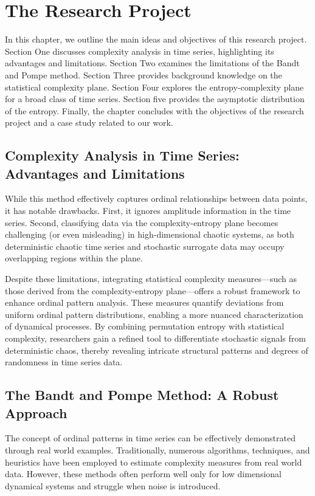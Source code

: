 \chapter{The Research Project}\label{C:aim}

In this chapter, we outline the main ideas and objectives of this research project. Section One discusses complexity analysis in time series, highlighting its advantages and limitations. Section Two examines the limitations of the Bandt and Pompe method. Section Three provides background knowledge on the statistical complexity plane. Section Four explores the entropy-complexity plane for a broad class of time series. Section five provides the asymptotic distribution of the entropy. Finally, the chapter concludes with the objectives of the research project and a case study related to our work.

\section*{Complexity Analysis in Time Series: Advantages and Limitations}

While this method effectively captures ordinal relationships between data points, it has notable drawbacks. First, it ignores amplitude information in the time series. Second, classifying data via the complexity-entropy plane becomes challenging (or even misleading) in high-dimensional chaotic systems, as both deterministic chaotic time series and stochastic surrogate data may occupy overlapping regions within the plane.

Despite these limitations, integrating statistical complexity measures—such as those derived from the complexity-entropy plane—offers a robust framework to enhance ordinal pattern analysis. These measures quantify deviations from uniform ordinal pattern distributions, enabling a more nuanced characterization of dynamical processes. By combining permutation entropy with statistical complexity, researchers gain a refined tool to differentiate stochastic signals from deterministic chaos, thereby revealing intricate structural patterns and degrees of randomness in time series data.

\section*{The Bandt and Pompe Method: A Robust Approach}

The concept of ordinal patterns in time series can be effectively demonstrated through real world examples. Traditionally, numerous algorithms, techniques, and heuristics have been employed to estimate complexity measures from real world data. However, these methods often perform well only for low dimensional dynamical systems and struggle when noise is introduced.


